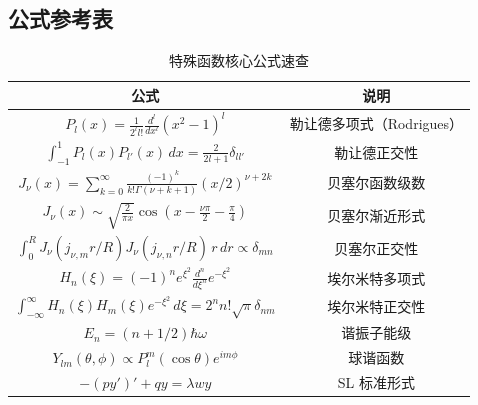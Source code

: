\begin{center}
\end{center}

\subsection*{公式参考表}

\begin{table}[h]
\centering
\caption{特殊函数核心公式速查}
\label{tab:special_func_formulas}
\begin{tabular}{c|c}
\toprule
公式 & 说明 \\
\midrule
$P_l(x) = \frac{1}{2^l l!}\frac{d^l}{dx^l}(x^2-1)^l$ & 勒让德多项式（Rodrigues） \\
$\int_{-1}^1 P_l(x)P_{l'}(x)\,dx = \frac{2}{2l+1}\delta_{ll'}$ & 勒让德正交性 \\
$J_\nu(x) = \sum_{k=0}^\infty \frac{(-1)^k}{k!\Gamma(\nu+k+1)}(x/2)^{\nu+2k}$ & 贝塞尔函数级数 \\
$J_\nu(x) \sim \sqrt{\frac{2}{\pi x}}\cos(x - \frac{\nu\pi}{2} - \frac{\pi}{4})$ & 贝塞尔渐近形式 \\
$\int_0^R J_\nu(j_{\nu,m}r/R)J_\nu(j_{\nu,n}r/R)\,r\,dr \propto \delta_{mn}$ & 贝塞尔正交性 \\
$H_n(\xi) = (-1)^n e^{\xi^2}\frac{d^n}{d\xi^n}e^{-\xi^2}$ & 埃尔米特多项式 \\
$\int_{-\infty}^\infty H_n(\xi)H_m(\xi)e^{-\xi^2}\,d\xi = 2^n n!\sqrt{\pi}\delta_{nm}$ & 埃尔米特正交性 \\
$E_n = (n+1/2)\hbar\omega$ & 谐振子能级 \\
$Y_{lm}(\theta,\phi) \propto P_l^m(\cos\theta)e^{im\phi}$ & 球谐函数 \\
$-(py')' + qy = \lambda w y$ & SL 标准形式 \\
\bottomrule
\end{tabular}
\end{table}

